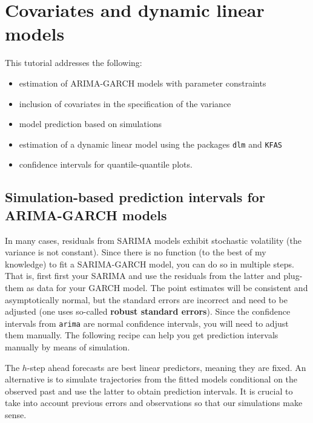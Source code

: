 \documentclass[]{book}
\providecommand{\tightlist}{%
  \setlength{\itemsep}{0pt}\setlength{\parskip}{0pt}}
\begin{document}
\hypertarget{covariates-and-dynamic-linear-models}{%
\chapter{Covariates and dynamic linear
models}\label{covariates-and-dynamic-linear-models}}

This tutorial addresses the following:

\begin{itemize}
\tightlist
\item
  estimation of ARIMA-GARCH models with parameter constraints
\item
  inclusion of covariates in the specification of the variance
\item
  model prediction based on simulations
\item
  estimation of a dynamic linear model using the packages \texttt{dlm}
  and \texttt{KFAS}
\item
  confidence intervals for quantile-quantile plots.
\end{itemize}

\hypertarget{simulation-based-prediction-intervals-for-arima-garch-models}{%
\section{Simulation-based prediction intervals for ARIMA-GARCH
models}\label{simulation-based-prediction-intervals-for-arima-garch-models}}

In many cases, residuals from SARIMA models exhibit stochastic
volatility (the variance is not constant). Since there is no function
(to the best of my knowledge) to fit a SARIMA-GARCH model, you can do so
in multiple steps. That is, first first your SARIMA and use the
residuals from the latter and plug-them as data for your GARCH model.
The point estimates will be consistent and asymptotically normal, but
the standard errors are incorrect and need to be adjusted (one uses
so-called \textbf{robust standard errors}). Since the confidence
intervals from \texttt{arima} are normal confidence intervals, you will
need to adjust them manually. The following recipe can help you get
prediction intervals manually by means of simulation.

The \(h\)-step ahead forecasts are best linear predictors, meaning they
are fixed. An alternative is to simulate trajectories from the fitted
models conditional on the observed past and use the latter to obtain
prediction intervals. It is crucial to take into account previous errors
and observations so that our simulations make sense.
\end{document}
